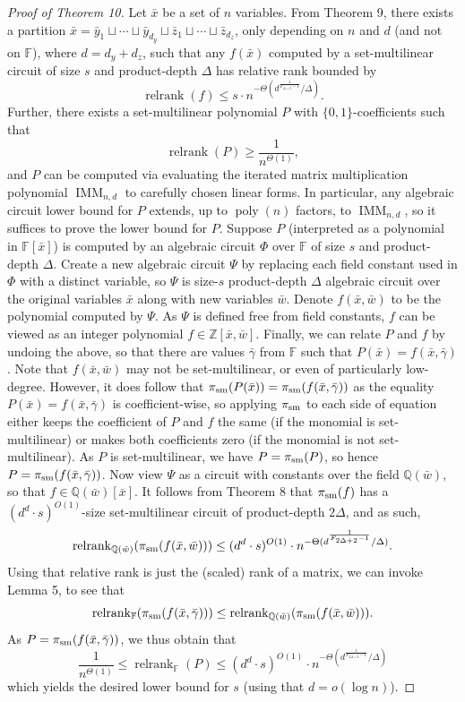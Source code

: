 \begin{proof}[Proof of Theorem 10]
Let $\bar x$ be a set of $n$ variables. From Theorem 9, there exists a partition $\bar x=\bar y_1\sqcup\cdots\sqcup\bar y_{d_y}\sqcup\bar z_1\sqcup\cdots\sqcup\bar z_{d_z}$, only depending on $n$ and $d$ (and not on $\mathbb F$), where $d=d_y+d_z$, such that any $f(\bar x)$ computed by a set-multilinear circuit of size $s$ and product-depth $\Delta$ has relative rank bounded by
\[\operatorname{relrank}(f)\le s\cdot n^{-\Theta(d^{\frac1{F_{\Delta+2}-1}}/\Delta)}.\]
Further, there exists a set-multilinear polynomial $P$ with $\{0,1\}$-coefficients such that
\[\operatorname{relrank}(P)\ge\frac1{n^{\Theta(1)}},\]
and $P$ can be computed via evaluating the iterated matrix multiplication polynomial $\operatorname{IMM}_{n,d}$ to carefully chosen linear forms. In particular, any algebraic circuit lower bound for $P$ extends, up to $\operatorname{poly}(n)$ factors, to $\operatorname{IMM}_{n,d}$, so it suffices to prove the lower bound for $P$.
Suppose $P$ (interpreted as a polynomial in $\mathbb F[\bar x]$) is computed by an algebraic circuit $\Phi$ over $\mathbb F$ of size $s$ and product-depth $\Delta$. Create a new algebraic circuit $\Psi$ by replacing each field constant used in $\Phi$ with a distinct variable, so $\Psi$ is size-$s$ product-depth $\Delta$ algebraic circuit over the original variables $\bar x$ along with new variables $\bar w$. Denote $f(\bar x,\bar w)$ to be the polynomial computed by $\Psi$. As $\Psi$ is defined free from field constants, $f$ can be viewed as an integer polynomial $f\in\mathbb Z[\bar x,\bar w]$. Finally, we can relate $P$ and $f$ by undoing the above, so that there are values $\bar\gamma$ from $\mathbb F$ such that $P(\bar x)=f(\bar x,\bar\gamma)$.
Note that $f(\bar x,\bar w)$ may not be set-multilinear, or even of particularly low-degree. However, it does follow that $\pi_{\rm sm}(P(\bar x))=\pi_{\rm sm}(f(\bar x,\bar\gamma))$ as the equality $P(\bar x)=f(\bar x,\bar\gamma)$ is coefficient-wise, so applying $\pi_{\rm sm}$ to each side of equation either keeps the coefficient of $P$ and $f$ the same (if the monomial is set-multilinear) or makes both coefficients zero (if the monomial is not set-multilinear). As $P$ is set-multilinear, we have $P=\pi_{\rm sm}(P)$, so hence $P=\pi_{\rm sm}(f(\bar x,\bar\gamma))$.
Now view $\Psi$ as a circuit with constants over the field $\mathbb Q(\bar w)$, so that $f\in\mathbb Q(\bar w)[\bar x]$. It follows from Theorem 8 that $\pi_{\rm sm}(f)$ has a $(d^d\cdot s)^{O(1)}$-size set-multilinear circuit of product-depth $2\Delta$, and as such,
\[\operatorname{relrank}_{\mathbb Q(\bar w)}(\pi_{\rm sm}(f(\bar x,\bar w)))\le(d^d\cdot s)^{O(1)}\cdot n^{-\Theta(d^{\frac1{F_{2\Delta+2}-1}}/\Delta)}.\]
Using that relative rank is just the (scaled) rank of a matrix, we can invoke Lemma 5, to see that
\[\operatorname{relrank}_{\mathbb F}(\pi_{\rm sm}(f(\bar x,\bar\gamma)))\le\operatorname{relrank}_{\mathbb Q(\bar w)}(\pi_{\rm sm}(f(\bar x,\bar w))).\]
As $P=\pi_{\rm sm}(f(\bar x,\bar\gamma))$, we thus obtain that
\[\frac1{n^{\Theta(1)}}\le\operatorname{relrank}_{\mathbb F}(P)\le(d^d\cdot s)^{O(1)}\cdot n^{-\Theta(d^{\frac1{F_{2\Delta+2}-1}}/\Delta)}\]
which yields the desired lower bound for $s$ (using that $d=o(\log n)$).
\end{proof}

